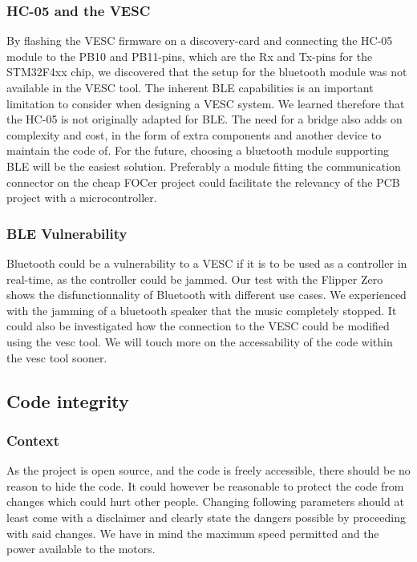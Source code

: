 \documentclass[conference]{IEEEtran}
\begin{document}
\subsubsection{HC-05 and the VESC}
By flashing the VESC firmware on a discovery-card and connecting the HC-05 module to the PB10 and PB11-pins, which are 
the Rx and Tx-pins for the STM32F4xx chip, we discovered that the setup for the bluetooth module was not available in 
the VESC tool. The inherent BLE capabilities is an important limitation to consider when designing a VESC system.
We learned therefore that the HC-05 is not originally adapted for BLE. The need for a bridge also adds on complexity 
and cost, in the form of extra components and another device to maintain the code of. For the future, choosing a 
bluetooth module supporting BLE will be the easiest solution. Preferably a module fitting the communication connector on
 the cheap FOCer project\cite{b1} could facilitate the relevancy of the PCB project with a microcontroller.

\subsubsection{BLE Vulnerability}
Bluetooth could be a vulnerability to a VESC if it is to be used as a controller in real-time, as the controller could 
be jammed. Our test with the Flipper Zero shows the disfunctionnality of Bluetooth with different use cases. 
We experienced with the jamming of a bluetooth speaker that the music completely stopped. It could also be investigated 
how the connection to the VESC could be modified using the vesc tool. We will touch more on the accessability of the 
code within the vesc tool sooner. 

\subsection{Code integrity}
\subsubsection{Context}
As the project is open source, and the code is freely accessible, there should be no reason to hide the code. It could 
however be reasonable to protect the code from changes which could hurt other people. Changing following parameters 
should at least come with a disclaimer and clearly state the dangers possible by proceeding with said changes. We 
have in mind the maximum speed permitted and the power available to the motors.
\end{document}
